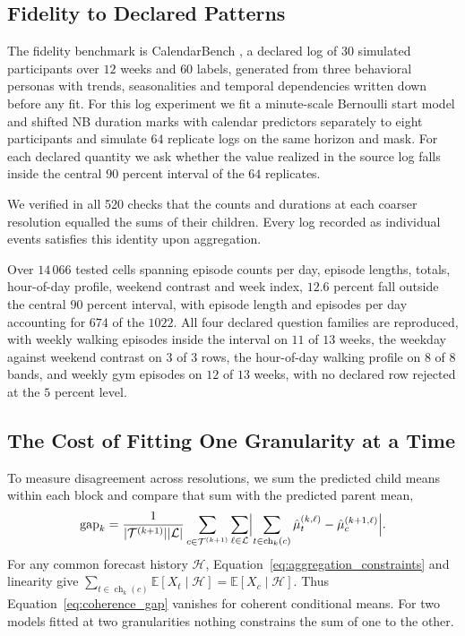 \documentclass[sigconf]{acmart}
\begin{document}
\subsection{Fidelity to Declared Patterns}
\label{sec:exp:fidelity}

The fidelity benchmark is CalendarBench \citep{calendarbench_2026}, a declared log of $30$ simulated participants over $12$ weeks and $60$ labels, generated from three behavioral personas with trends, seasonalities and temporal dependencies written down before any fit. For this log experiment we fit a minute-scale Bernoulli start model and shifted NB duration marks with calendar predictors separately to eight participants and simulate $64$ replicate logs on the same horizon and mask. For each declared quantity we ask whether the value realized in the source log falls inside the central $90$ percent interval of the $64$ replicates.

We verified in all 520 checks that the counts and durations at each coarser resolution equalled the sums of their children. Every log recorded as individual events satisfies this identity upon aggregation.

Over $14\,066$ tested cells spanning episode counts per day, episode lengths, totals, hour-of-day profile, weekend contrast and week index, $12.6$ percent fall outside the central $90$ percent interval, with episode length and episodes per day accounting for $674$ of the $1022$. All four declared question families are reproduced, with weekly walking episodes inside the interval on $11$ of $13$ weeks, the weekday against weekend contrast on $3$ of $3$ rows, the hour-of-day walking profile on $8$ of $8$ bands, and weekly gym episodes on $12$ of $13$ weeks, with no declared row rejected at the $5$ percent level.

\subsection{The Cost of Fitting One Granularity at a Time}
\label{sec:exp:coherence}

To measure disagreement across resolutions, we sum the predicted child means within each block and compare that sum with the predicted parent mean,
\begin{equation}
  \mathrm{gap}_k=\frac{1}{|\mathcal T^{(k+1)}||\mathcal L|}
  \sum_{c\in\mathcal T^{(k+1)}}\sum_{\ell\in\mathcal L}
  \Bigl|\sum_{t\in\operatorname{ch}_k(c)}\hat\mu_t^{(k,\ell)}
  -\hat\mu_c^{(k+1,\ell)}\Bigr| .
  \label{eq:coherence_gap}
\end{equation}
For any common forecast history \(\mathcal H\), Equation~\eqref{eq:aggregation_constraints} and linearity give \(\sum_{t\in\operatorname{ch}_k(c)}\mathbb E[X_t\mid\mathcal H]=\mathbb E[X_c\mid\mathcal H]\). Thus Equation~\eqref{eq:coherence_gap} vanishes for coherent conditional means. For two models fitted at two granularities nothing constrains the sum of one to the other.
\end{document}
